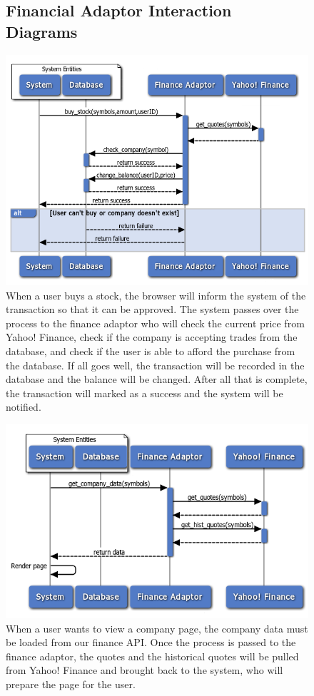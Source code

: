 \begin{figure}
\subsection{Financial Adaptor Interaction Diagrams}
\centering
\includegraphics[width=5.5in]{./Diagrams/InteractionDiagrams/buyingstock.png}
\caption{When a user buys a stock, the browser will inform the system of the transaction so that it can be approved. The system passes over the process to the finance adaptor who will check the current price from Yahoo! Finance, check if the company is accepting trades from the database, and check if the user is able to afford the purchase from the database. If all goes well, the transaction will be recorded in the database and the balance will be changed. After all that is complete, the transaction will marked as a success and the system will be notified.}
\end{figure}

\begin{figure}
\centering
\includegraphics[width=5.5in]{./Diagrams/InteractionDiagrams/rendercompanypage.png}
\caption{When a user wants to view a company page, the company data must be loaded from our finance API. Once the process is passed to the finance adaptor, the quotes and the historical quotes will be pulled from Yahoo! Finance and brought back to the system, who will prepare the page for the user.}
\end{figure}

